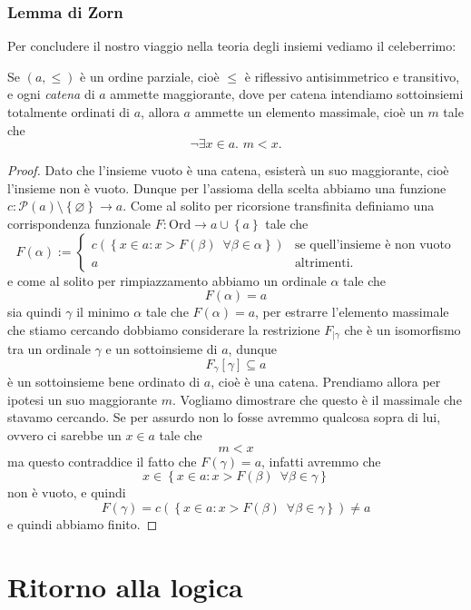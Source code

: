 \documentclass[11pt]{scrartcl}
\newcommand{\eset}{\varnothing}
\newcommand{\parti}[1]{\mathcal{P}\!\left(#1\right)}
\begin{document}
 	\subsubsection{Lemma di Zorn}
 	Per concludere il nostro viaggio nella teoria degli insiemi vediamo il celeberrimo:
 	\begin{lemma}[Zorn]
 		Se $(a,\le)$ è un ordine parziale, cioè $\le $ è riflessivo antisimmetrico e transitivo, e ogni \textit{catena} di $a$ ammette maggiorante, dove per catena intendiamo sottoinsiemi totalmente ordinati di $a$, allora $a$ ammette un elemento massimale, cioè un $m$ tale che
 		$$\lnot \exists x\in a.\,\,m<x.$$
 	\end{lemma}
 	\begin{proof}
 		Dato che l'insieme vuoto è una catena, esisterà un suo maggiorante, cioè l'insieme non è vuoto. Dunque per l'assioma della scelta abbiamo una funzione $c:\parti{a}\setminus\left\{\eset\right\}\to a$. Come al solito per ricorsione transfinita definiamo una corrispondenza funzionale $F:\text{Ord}\to a \cup\left\{a\right\}$ tale che
 		$$
 		F(\alpha):=
 		\begin{cases}
 			c\left(\left\{x\in a:x>F(\beta) \,\,\,\forall\beta\in \alpha\right\}\right) & \text{se quell'insieme è non vuoto}\\
 			a &\text{altrimenti.}
 		\end{cases}
 		$$ 
 		e come al solito per rimpiazzamento abbiamo un ordinale $\alpha$ tale che 
 		$$F(\alpha)=a$$
 		sia quindi $\gamma$ il minimo $\alpha$ tale che $F(\alpha)=a$, per estrarre l'elemento massimale che stiamo cercando dobbiamo considerare la restrizione $F_{\mid \gamma}$ che è un isomorfismo tra un ordinale $\gamma$ e un sottoinsieme di $a$, dunque
 		$$F_\gamma\left[\gamma\right]\subseteq a$$
 		è un sottoinsieme bene ordinato di $a$, cioè è una catena. Prendiamo allora per ipotesi un suo maggiorante $m$. Vogliamo dimostrare che questo è il massimale che stavamo cercando. Se per assurdo non lo fosse avremmo qualcosa sopra di lui, ovvero ci sarebbe un $x\in a$ tale che 
 		$$m<x$$
 		ma questo contraddice il fatto che $F(\gamma)=a$, infatti avremmo che
 		$$x\in \left\{x\in a:x>F(\beta) \,\,\,\forall\beta\in \gamma\right\}$$ 
 		non è vuoto, e quindi
 		$$F(\gamma)=c\left(\left\{x\in a:x>F(\beta) \,\,\,\forall\beta\in \gamma\right\}\right)\ne a$$
 		e quindi abbiamo finito.
 	\end{proof}
 	
 	\newpage
 	
 	\section{Ritorno alla logica}
 	
\end{document}
